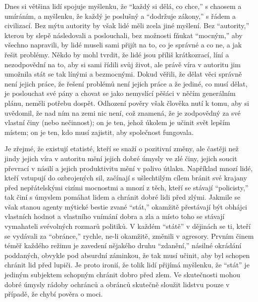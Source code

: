 \documentclass{book}
\begin{document}
Dnes si většina lidí spojuje myšlenku, že \enquote{každý si dělá, co chce,} s chaosem a umíráním, a myšlenku, že každý je poslušný a \enquote{dodržuje zákony,} s řádem a civilizací. Bez mýtu autority by však lidé měli zcela jiné myšlení. Bez \enquote{autority,} kterou by slepě následovali a poslouchali, bez možnosti fňukat \enquote{mocným,} aby všechno napravili, by lidé museli sami přijít na to, co je správné a co ne, a jak řešit problémy. Někdo by mohl tvrdit, že lidé jsou příliš krátkozrací, líní a nezodpovědní na to, aby si sami řídili svůj život, ale právě víra v autoritu jim umožnila stát se tak línými a bezmocnými. Dokud věřili, že dělat věci správně není jejich práce, že řešení problémů není jejich práce a že jediné, co musí dělat, je poslouchat své pány a chovat se jako nemyslící pěšáci v něčím generálním plánu, neměli potřebu dospět. Odhození pověry však člověka nutí k tomu, aby si uvědomil, že nad ním na zemi nic není, což znamená, že je zodpovědný za své vlastní činy (nebo nečinnost); on je ten, jehož úkolem je učinit svět lepším místem; on je ten, kdo musí zajistit, aby společnost fungovala.

Je zřejmé, že existují etatisté, kteří se snaží o pozitivní změny, ale častěji než jindy jejich víra v autoritu mění jejich dobré úmysly ve zlé činy, jejich soucit převrací v násilí a jejich produktivitu mění v palivo útlaku. Například mnozí lidé, kteří vstupují do ozbrojených sil, začínají s ušlechtilým cílem bránit své krajany před nepřátelskými cizími mocnostmi a mnozí z těch, kteří se stávají \enquote{policisty,} tak činí s úmyslem pomáhat lidem a chránit dobré lidi před zlými. Jakmile se však stanou agenty mýtické bestie zvané \enquote{stát,} okamžitě přestávají být obhájci vlastních hodnot a vlastního vnímání dobra a zla a místo toho se stávají vymahateli svévolných rozmarů politiků. V každém \enquote{státě} v dějinách se ti, kteří se vydávali za \enquote{obránce,} rychle, ne-li okamžitě, změnili v agresory. Prvním činem téměř každého režimu je zavedení nějakého druhu \enquote{zdanění,} násilné okrádání poddaných, obvykle pod absurdní záminkou, že tak musí učinit, aby byl schopen chránit lid před lupiči. Je proto ironií, že tolik lidí přijímá myšlenku, že \enquote{stát} je jediným subjektem schopným chránit dobro před zlem. Ve skutečnosti mohou dobré úmysly rádoby ochránců a obránců skutečně sloužit lidstvu pouze v případě, že chybí pověra o moci.
\end{document}
